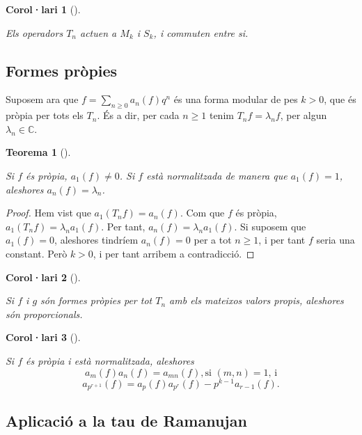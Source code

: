 \documentclass[
  letterpaper,
  DIV=11,
  numbers=noendperiod]{scrreprt}
\theoremstyle{plain}
\newtheorem{theorem}{Teorema}[chapter]
\theoremstyle{plain}
\newtheorem{corollary}{Corol·lari}[chapter]
\theoremstyle{definition}
\theoremstyle{plain}
\theoremstyle{plain}
\theoremstyle{definition}
\theoremstyle{remark}
\begin{document}
\begin{corollary}[]\protect\hypertarget{cor-}{}\label{cor-}

Els operadors \(T_n\) actuen a \(M_k\) i \(S_k\), i commuten entre si.

\end{corollary}

\subsection{Formes pròpies}\label{formes-pruxf2pies}

Suposem ara que \(f=\sum_{n\geq 0} a_n(f)q^n\) és una forma modular de
pes \(k>0\), que és pròpia per tots els \(T_n\). És a dir, per cada
\(n\geq 1\) tenim \(T_nf=\lambda_nf\), per algun
\(\lambda_n\in\mathbb{C}\).

\begin{theorem}[]\protect\hypertarget{thm-}{}\label{thm-}

Si \(f\) és pròpia, \(a_1(f)\neq 0\). Si \(f\) està normalitzada de
manera que \(a_1(f)=1\), aleshores \(a_n(f) = \lambda_n\).

\end{theorem}

\begin{proof}
Hem vist que \(a_1(T_nf) = a_n(f)\). Com que \(f\) és pròpia,
\(a_1(T_nf) = \lambda_n a_1(f)\). Per tant,
\(a_n(f) = \lambda_n a_1(f)\). Si suposem que \(a_1(f)=0\), aleshores
tindríem \(a_n(f)=0\) per a tot \(n\geq 1\), i per tant \(f\) seria una
constant. Però \(k>0\), i per tant arribem a contradicció.
\end{proof}

\begin{corollary}[]\protect\hypertarget{cor-}{}\label{cor-}

Si \(f\) i \(g\) són formes pròpies per tot \(T_n\) amb els mateixos
valors propis, aleshores són proporcionals.

\end{corollary}

\begin{corollary}[]\protect\hypertarget{cor-}{}\label{cor-}

Si \(f\) és pròpia i està normalitzada, aleshores \[
a_m(f)a_n(f)=a_{mn}(f),\text{si $(m,n)=1$, i}
\] \[
a_{p^{r+1}}(f) = a_p(f)a_{p^r}(f) - p^{k-1} a_{r-1}(f).
\]

\end{corollary}

\subsection{Aplicació a la tau de
Ramanujan}\label{aplicaciuxf3-a-la-tau-de-ramanujan}
\end{document}
